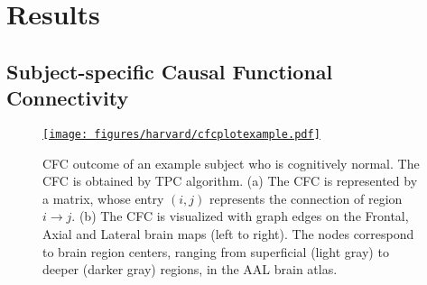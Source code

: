 \documentclass[12pt,reqno]{amsart}
\theoremstyle{definition}
\begin{document}
\section{Results}
%
\subsection{Subject-specific Causal Functional Connectivity}

\begin{figure}[t!]
    \centering
    \href{https://drive.google.com/file/d/1PESbwDAfwjLpT2RTwHBYCfkOrOKNN4ic/view?usp=sharing}{\texttt{[image: figures/harvard/cfcplotexample.pdf]}}
    \caption{CFC outcome of an example subject who is cognitively normal. The CFC is obtained by TPC algorithm. (a) The CFC is represented by a matrix, whose entry $(i,j)$ represents the connection of region $i\rightarrow j$. (b) The CFC is visualized with graph edges on the Frontal, Axial and Lateral brain maps (left to right). The nodes correspond to brain region centers, ranging from superficial (light gray) to deeper (darker gray) regions, in the AAL brain atlas.}
    \label{fig:cfcexample}
\end{figure}
\end{document}
